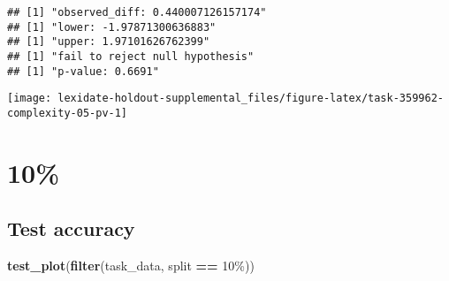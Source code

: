 \documentclass[
]{book}
\newenvironment{Shaded}{\begin{snugshade}}{\end{snugshade}}
\newcommand{\AttributeTok}[1]{\textcolor[rgb]{0.13,0.29,0.53}{#1}}
\newcommand{\DecValTok}[1]{\textcolor[rgb]{0.00,0.00,0.81}{#1}}
\newcommand{\FunctionTok}[1]{\textcolor[rgb]{0.13,0.29,0.53}{\textbf{#1}}}
\newcommand{\NormalTok}[1]{#1}
\newcommand{\OtherTok}[1]{\textcolor[rgb]{0.56,0.35,0.01}{#1}}
\newcommand{\SpecialCharTok}[1]{\textcolor[rgb]{0.81,0.36,0.00}{\textbf{#1}}}
\newcommand{\StringTok}[1]{\textcolor[rgb]{0.31,0.60,0.02}{#1}}
\begin{document}
\begin{Shaded}
\end{Shaded}

\begin{verbatim}
## [1] "observed_diff: 0.440007126157174"
## [1] "lower: -1.97871300636883"
## [1] "upper: 1.97101626762399"
## [1] "fail to reject null hypothesis"
## [1] "p-value: 0.6691"
\end{verbatim}

\texttt{[image: lexidate-holdout-supplemental\_files/figure-latex/task-359962-complexity-05-pv-1]}

\hypertarget{section-56}{%
\section{10\%}\label{section-56}}

\hypertarget{test-accuracy-56}{%
\subsection{Test accuracy}\label{test-accuracy-56}}

\begin{Shaded}
\begin{Highlighting}[]
\FunctionTok{test\_plot}\NormalTok{(}\FunctionTok{filter}\NormalTok{(task\_data, split }\SpecialCharTok{==} \StringTok{\textquotesingle{}10\%\textquotesingle{}}\NormalTok{))}
\end{Highlighting}
\end{Shaded}
\end{document}
